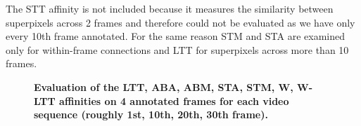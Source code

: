 The STT affinity is not included because it measures the similarity between superpixels across 2 frames and therefore could not be evaluated as we have only every 10th frame annotated.
For the same reason STM and STA are examined only for within-frame connections and LTT for superpixels across more than 10 frames.
\begin{figure}[htbp]
\centering
\addtolength{\subfigcapskip}{0.07in}
\quad%
\caption[Evaluation of the LTT, ABA, ABM, STA, STM, W, W-LTT affinities on 4 annotated frames for each video sequence]{
{\bf Evaluation of the LTT, ABA, ABM, STA, STM, W, W-LTT affinities on 4 annotated frames for each video sequence (roughly 1st, 10th, 20th, 30th frame).}}
\label{fig:affin_10th}
\end{figure}

